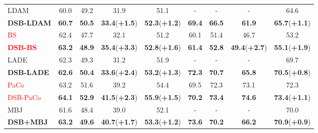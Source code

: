 \documentclass[10pt]{article} %
\begin{document}
\begin{table}[h]
\begin{tabular}{l|cccc| cccc }
LDAM \cite {paper104} &60.0 & 49.2 & 31.9 & 51.1 & \multicolumn{1}{c}{-}  & \multicolumn{1}{c}{-} & \multicolumn{1}{c}{-} & 64.6\\
\textbf{DSB-LDAM} &\textbf{60.7} & \textbf{50.5} & \textbf{33.4}(\textcolor[RGB]{0,201,87}{\textbf{+1.5}}) & \textbf{52.3}(\textcolor[RGB]{0,201,87}{\textbf{+1.2}}) & \textbf{69.4}  & \textbf{66.5}  & \textbf{61.9} & \textbf{65.7}(\textcolor[RGB]{0,201,87}{\textbf{+1.1}}) \\ \hline

\textcolor{red}{BS} \cite {paper105} &62.4 & 47.7 &32.1  & 51.2  & 60.1 & 51.4 & 46.7 & 53.2 \\
\textcolor{red}{\textbf{DSB-BS}} &\textbf{63.2} & \textbf{48.9} & \textbf{35.4}(\textcolor[RGB]{0,201,87}{\textbf{+3.3}}) & \textbf{52.8}(\textcolor[RGB]{0,201,87}{\textbf{+1.6}}) & \textbf{61.4} & \textbf{52.8} & \textbf{49.4}(\textcolor[RGB]{0,201,87}{\textbf{+2.7}}) & \textbf{55.1}(\textcolor[RGB]{0,201,87}{\textbf{+1.9}}) \\ \hline

LADE \cite {paper106} &62.3 & 49.3 & 31.2 & 51.9 & \multicolumn{1}{c}{-}  & \multicolumn{1}{c}{-} & \multicolumn{1}{c}{-} & 69.7\\
\textbf{DSB-LADE} &\textbf{62.6} & \textbf{50.4} & \textbf{33.6}(\textcolor[RGB]{0,201,87}{\textbf{+2.4}}) & \textbf{53.2}(\textcolor[RGB]{0,201,87}{\textbf{+1.3}}) & \textbf{72.3}  & \textbf{70.7}  & \textbf{65.8}  & \textbf{70.5}(\textcolor[RGB]{0,201,87}{\textbf{+0.8}}) \\ \hline

\textcolor{red}{PaCo} \cite {paper73} &63.2 & 51.6 & 39.2 & 54.4 & 69.5  & 72.3 & 73.1 & 72.3 \\
\textcolor{red}{DSB-PaCo} &\textbf{64.1} & \textbf{52.9} & \textbf{41.5}(\textcolor[RGB]{0,201,87}{\textbf{+2.3}}) & \textbf{55.9}(\textcolor[RGB]{0,201,87}{\textbf{+1.5}}) & \textbf{70.2}  & \textbf{73.4}  & \textbf{74.6}  & \textbf{73.4}(\textcolor[RGB]{0,201,87}{\textbf{+1.1}}) \\ \hline

MBJ \cite {paper72} &61.6 & 48.4 & 39.0 & 52.1 & \multicolumn{1}{c}{-}  & \multicolumn{1}{c}{-} & \multicolumn{1}{c}{-} & 70.0 \\
\textbf{DSB+MBJ} &\textbf{63.2} & \textbf{49.6} & \textbf{40.7}(\textcolor[RGB]{0,201,87}{\textbf{+1.7}}) & \textbf{53.3}(\textcolor[RGB]{0,201,87}{\textbf{+1.2}}) &\textbf{73.6}  & \textbf{70.2} & \textbf{66.2} & \textbf{70.9}(\textcolor[RGB]{0,201,87}{\textbf{+0.9}}) \\ \hline


\end{tabular}
\end{table}
\end{document}
